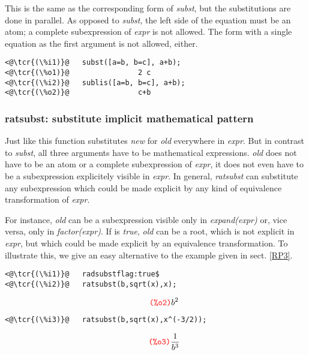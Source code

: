 \documentclass[../Maxima_Workbook.tex]{subfiles}
\begin{document}
\lz This is the same as the corresponding form of \emph{subst}, but the substitutions are done in parallel. As opposed to \emph{subst}, the left side of the equation must be an atom; a complete subexpression of \emph{expr} is not allowed. The form with a single equation as the first argument is not allowed, either. 

\lz \begin{lstlisting}
<@\tcr{(\%i1)}@   subst([a=b, b=c], a+b);
<@\tcr{(\%o1)}@			       2 c
<@\tcr{(\%i2)}@   sublis([a=b, b=c], a+b);
<@\tcr{(\%o2)}@			       c+b
\end{lstlisting}

\subsubsection{ratsubst: substitute implicit mathematical pattern}

\lz{} \hfill \tcr{[function]}

\lz Just like  this function substitutes \emph{new} for \emph{old} everywhere in \emph{expr}. But in contrast to \emph{subst}, all three arguments have to be mathematical expressions. \emph{old} does not have to be an atom or a complete subexpression of \emph{expr}, it does not even have to be a subexpression explicitely visible in \emph{expr}. In general, \emph{ratsubst} can substitute any subexpression which could be made explicit by any kind of equivalence transformation of \emph{expr}.

\lz For instance, \emph{old} can be a subexpression visible only in \emph{expand(expr)} or, vice versa, only in \emph{factor(expr)}. If  is \emph{true}, \emph{old} can be a root, which is not explicit in \emph{expr}, but which could be made explicit by an equivalence transformation. To illustrate this, we give an easy alternative to the example given in sect. \ref{RP3}.

\lz \begin{small}
\color{blue} \leqn
\begin{lstlisting}
<@\tcr{(\%i1)}@   radsubstflag:true$
<@\tcr{(\%i2)}@   ratsubst(b,sqrt(x),x);
\end{lstlisting}
\vspace{-5mm} \[\tag*{\tcr{\ttfamily (\%o2)}} {{b}^{2}} \]
\vspace{-9mm} \begin{lstlisting}
<@\tcr{(\%i3)}@   ratsubst(b,sqrt(x),x^(-3/2));
\end{lstlisting}
\vspace{-5mm} \[\tag*{\tcr{\ttfamily (\%o3)}} \frac{1}{{{b}^{3}}} \]
\color{black} \reqn
\end{small} \vspace{-4mm}
\end{document}
